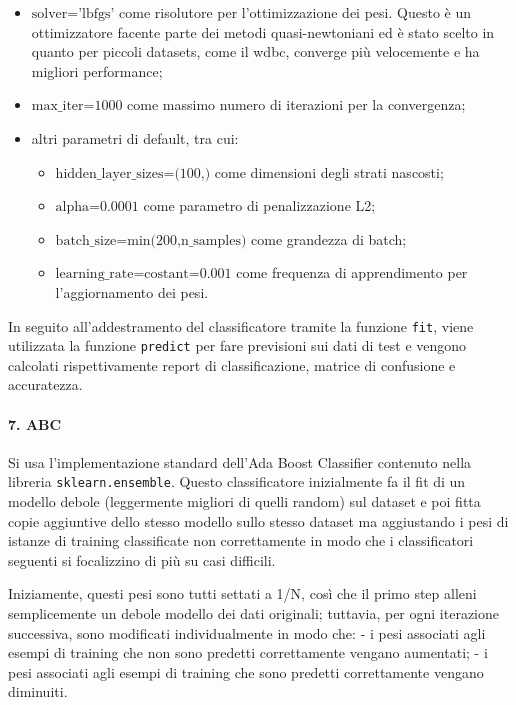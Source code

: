 \documentclass[11pt]{article}
\providecommand{\tightlist}{%
      \setlength{\itemsep}{0pt}\setlength{\parskip}{0pt}}
\begin{document}
\begin{itemize}
\tightlist
\item
  \(\text{solver='lbfgs'}\) come risolutore per l'ottimizzazione dei
  pesi. Questo è un ottimizzatore facente parte dei metodi
  quasi-newtoniani ed è stato scelto in quanto per piccoli datasets,
  come il wdbc, converge più velocemente e ha migliori performance;
\item
  \(\text{max_iter=1000}\) come massimo numero di iterazioni per la
  convergenza;
\item
  altri parametri di default, tra cui:

  \begin{itemize}
  \tightlist
  \item
    \(\text{hidden_layer_sizes=(100,)}\) come dimensioni degli strati
    nascosti;
  \item
    \(\text{alpha=0.0001}\) come parametro di penalizzazione L2;
  \item
    \(\text{batch_size=min(200,n_samples)}\) come grandezza di batch;
  \item
    \(\text{learning_rate=costant=0.001}\) come frequenza di
    apprendimento per l'aggiornamento dei pesi.
  \end{itemize}
\end{itemize}

In seguito all'addestramento del classificatore tramite la funzione
\texttt{fit}, viene utilizzata la funzione \texttt{predict} per fare
previsioni sui dati di test e vengono calcolati rispettivamente report
di classificazione, matrice di confusione e accuratezza.

    \paragraph{7. ABC}\label{abc}

    Si usa l'implementazione standard dell'Ada Boost Classifier contenuto
nella libreria \texttt{sklearn.ensemble}. Questo classificatore
inizialmente fa il fit di un modello debole (leggermente migliori di
quelli random) sul dataset e poi fitta copie aggiuntive dello stesso
modello sullo stesso dataset ma aggiustando i pesi di istanze di
training classificate non correttamente in modo che i classificatori
seguenti si focalizzino di più su casi difficili.

Iniziamente, questi pesi sono tutti settati a 1/N, così che il primo
step alleni semplicemente un debole modello dei dati originali;
tuttavia, per ogni iterazione successiva, sono modificati
individualmente in modo che: - i pesi associati agli esempi di training
che non sono predetti correttamente vengano aumentati; - i pesi
associati agli esempi di training che sono predetti correttamente
vengano diminuiti.
\end{document}

